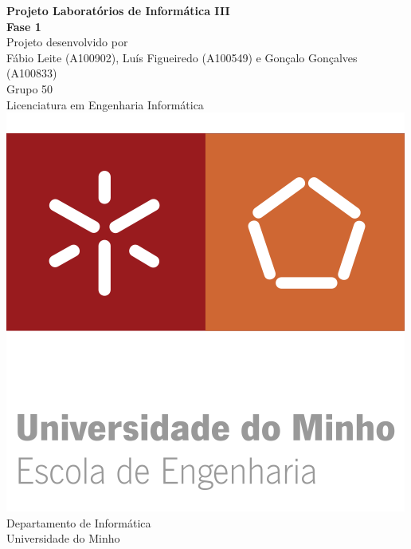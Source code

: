 \documentclass[12pt,a4paper]{report}
\begin{document}
\begin{titlepage}
    {\centering
        {
        \LARGE{\textbf{Projeto Laboratórios de Informática III\\Fase 1}} \\ 
        \vspace*{\fill} 
        {\large{Projeto desenvolvido por}} \\
        \vspace 
        \large{ Fábio  Leite (A100902),  Luís Figueiredo (A100549) e Gonçalo Gonçalves (A100833)} \\
        {\small{Grupo 50}}
        \vspace*{\fill} \\
        {\Large Licenciatura em Engenharia Informática} \\
        \vspace*{\fill}
        \includegraphics[scale=1.25]{eeng.png} \\ [0.5cm]
        {\large Departamento de Informática \\ Universidade do Minho} \\
        }
    }
\end{titlepage}

\newpage

    \tableofcontents

\newpage
\end{document}
